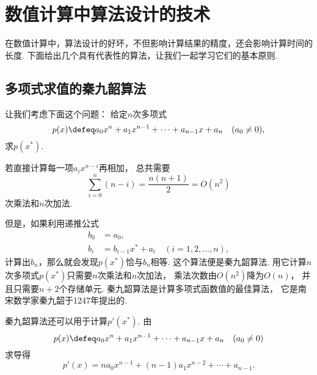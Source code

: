 \section{数值计算中算法设计的技术}
在数值计算中，算法设计的好坏，不但影响计算结果的精度，还会影响计算时间的长度.
下面给出几个具有代表性的算法，让我们一起学习它们的基本原则.

\subsection{多项式求值的秦九韶算法}
让我们考虑下面这个问题：
给定\(n\)次多项式\begin{equation*}
	p(x)
	\defeq
	a_0 x^n + a_1 x^{n-1} + \dotsb + a_{n-1} x + a_n
	\quad(a_0\neq0),
\end{equation*}
求\(p(x^*)\).

若直接计算每一项\(a_i x^{n-i}\)再相加，
总共需要\begin{equation*}
	\sum_{i=0}^n (n-i)
	= \frac{n(n+1)}{2}
	= O(n^2)
\end{equation*}
次乘法和\(n\)次加法.

但是，如果利用递推公式\begin{align*}
	b_0 &= a_0, \\
	b_i &= b_{i-1} x^* + a_i
	\quad(i=1,2,\dotsc,n),
\end{align*}
计算出\(b_n\)，那么就会发现\(p(x^*)\)恰与\(b_n\)相等.
这个算法便是秦九韶算法.
用它计算\(n\)次多项式\(p(x^*)\)只需要\(n\)次乘法和\(n\)次加法，
乘法次数由\(O(n^2)\)降为\(O(n)\)，
并且只需要\(n+2\)个存储单元.
秦九韶算法是计算多项式函数值的最佳算法，
它是南宋数学家秦九韶于1247年提出的.

秦九韶算法还可以用于计算\(p'(x^*)\).
由\begin{equation*}
	p(x)
	\defeq
	a_0 x^n + a_1 x^{n-1} + \dotsb + a_{n-1} x + a_n
	\quad(a_0\neq0)
\end{equation*}
求导得\begin{equation*}
	p'(x)
	= n a_0 x^{n-1} + (n-1) a_1 x^{n-2} + \dotsb + a_{n-1}.
\end{equation*}
